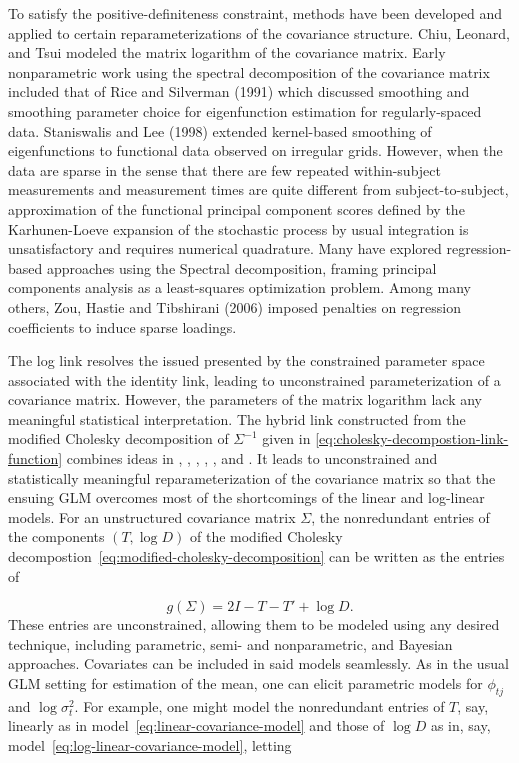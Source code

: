 To satisfy the positive-definiteness constraint, methods have been developed and applied to certain reparameterizations of the covariance structure. Chiu, Leonard, and Tsui modeled the matrix logarithm of the covariance matrix. Early nonparametric work using the spectral decomposition of the covariance matrix included that of Rice and Silverman (1991) which discussed smoothing and smoothing parameter choice for eigenfunction estimation for regularly-spaced data. Staniswalis and Lee (1998) extended kernel-based smoothing of eigenfunctions to functional data observed on irregular grids. However, when the data are sparse in the sense that there are few repeated within-subject measurements and measurement times are quite different from subject-to-subject, approximation of the functional principal component scores defined by the Karhunen-Loeve expansion of the stochastic process by usual integration is unsatisfactory and requires numerical quadrature. Many have explored regression-based approaches using the Spectral decomposition, framing principal components analysis as a least-squares optimization problem. Among many others, Zou, Hastie and Tibshirani (2006) imposed penalties on regression coefficients to induce sparse loadings. {}
\bigskip

The log link resolves the issued presented by the constrained parameter space associated with the identity link, leading to unconstrained parameterization of a covariance matrix. However, the parameters of the matrix logarithm lack any meaningful statistical interpretation. The hybrid link  constructed from the modified Cholesky decomposition of $\Sigma^{-1}$ given in \ref{eq:cholesky-decompostion-link-function} combines ideas in \citet{edgeworth1892xxii}, \citet{gabriel1962ante}, \citet{anderson1973asymptotically}, \citet{dempster1972covariance}, \citet{chiu1996matrix}, and \citet{zimmerman1997structured}. It leads to unconstrained and statistically meaningful reparameterization of the covariance matrix so that the ensuing GLM overcomes most of the shortcomings of the linear and log-linear models.  For an unstructured covariance matrix $\Sigma$, the nonredundant entries of the components $\left(T, \log D\right)$ of the modified Cholesky decompostion~\ref{eq:modified-cholesky-decomposition} can be written as the entries of 

\begin{equation}\label{eq:cholesky-decompostion-link-function}
g\left( \Sigma \right) = 2I - T - T' + \log D.
\end{equation}
\noindent
These entries are unconstrained, allowing them to be modeled using any desired technique, including parametric, semi- and nonparametric, and Bayesian approaches. Covariates can be included in said models seamlessly. As in the usual GLM setting for estimation of the mean, one can elicit parametric models for $\phi_{tj}$ and $\log\sigma_t^2$.  For example, one might model the nonredundant entries of $T$, say, linearly as in model~\ref{eq:linear-covariance-model} and those of $\log D$ as in, say, model~\ref{eq:log-linear-covariance-model}, letting

